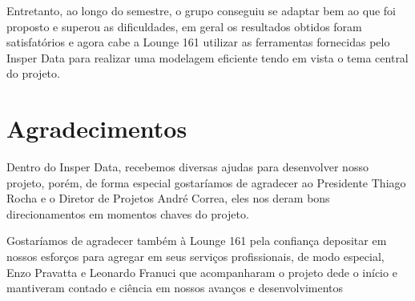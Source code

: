 Entretanto, ao longo do semestre, o grupo conseguiu se adaptar bem ao que 
foi proposto e superou as dificuldades, em geral os resultados obtidos foram 
satisfatórios e agora cabe a Lounge 161 utilizar as ferramentas fornecidas pelo 
Insper Data para realizar uma modelagem eficiente tendo em vista o tema central 
do projeto.

\section*{Agradecimentos}

Dentro do Insper Data, recebemos diversas ajudas para desenvolver nosso 
projeto, porém, de forma especial gostaríamos de agradecer ao Presidente Thiago Rocha 
e o Diretor de Projetos André Correa, eles nos deram bons direcionamentos em 
momentos chaves do projeto.

Gostaríamos de agradecer também à Lounge 161 pela confiança depositar em 
nossos esforços para agregar em seus serviços profissionais, de modo especial, Enzo 
Pravatta e Leonardo Franuci que acompanharam o projeto dede o início e mantiveram 
contado e ciência em nossos avanços e desenvolvimentos